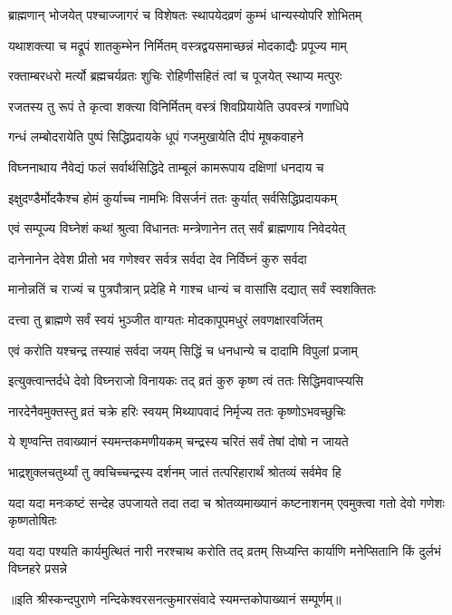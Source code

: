 \begin{center}
\twolineshloka
{ब्राह्मणान् भोजयेत् पश्चाज्जागरं च विशेषतः}
{स्थापयेदव्रणं कुम्भं धान्यस्योपरि शोभितम्}%

\twolineshloka
{यथाशक्त्या च मद्रूपं शातकुम्भेन निर्मितम्}
{वस्त्रद्वयसमाच्छन्नं मोदकाद्यैः प्रपूज्य माम्}%

\twolineshloka
{रक्ताम्बरधरो मर्त्यो ब्रह्मचर्यव्रतः शुचिः}
{रोहिणीसहितं त्वां च पूजयेत् स्थाप्य मत्पुरः}%

\twolineshloka
{रजतस्य तु रूपं ते कृत्वा शक्त्या विनिर्मितम्}
{वस्त्रं शिवप्रियायेति उपवस्त्रं गणाधिपे}%

\twolineshloka
{गन्धं लम्बोदरायेति पुष्पं सिद्धिप्रदायके}
{धूपं गजमुखायेति दीपं मूषकवाहने}%

\twolineshloka
{विघ्ननाथाय नैवेद्यं फलं सर्वार्थसिद्धिदे}
{ताम्बूलं कामरूपाय दक्षिणां धनदाय च}%

\twolineshloka
{इक्षुदण्डैर्मोदकैश्च होमं कुर्याच्च नामभिः}
{विसर्जनं ततः कुर्यात् सर्वसिद्धिप्रदायकम्}%

\twolineshloka
{एवं सम्पूज्य विघ्नेशं कथां श्रुत्वा विधानतः}
{मन्त्रेणानेन तत् सर्वं ब्राह्मणाय निवेदयेत्}%

\twolineshloka
{दानेनानेन देवेश प्रीतो भव गणेश्वर}
{सर्वत्र सर्वदा देव निर्विघ्नं कुरु सर्वदा}%

\twolineshloka
{मानोन्नतिं च राज्यं च पुत्रपौत्रान् प्रदेहि मे}
{गाश्च धान्यं च वासांसि दद्यात् सर्वं स्वशक्तितः}%

\twolineshloka
{दत्त्वा तु ब्राह्मणे सर्वं स्वयं भुञ्जीत वाग्यतः}
{मोदकापूपमधुरं लवणक्षारवर्जितम्}%

\twolineshloka
{एवं करोति यश्चन्द्र तस्याहं सर्वदा जयम्}
{सिद्धिं च धनधान्ये च दादामि विपुलां प्रजाम्}%

\twolineshloka
{इत्युक्त्वान्तर्दधे देवो विघ्नराजो विनायकः}
{तद् व्रतं कुरु कृष्ण त्वं ततः सिद्धिमवाप्स्यसि}%

\twolineshloka
{नारदेनैवमुक्तस्तु व्रतं चक्रे हरिः स्वयम्}
{मिथ्यापवादं निर्मृज्य ततः कृष्णोऽभवच्छुचिः}%

\twolineshloka
{ये शृण्वन्ति तवाख्यानं स्यमन्तकमणीयकम्}
{चन्द्रस्य चरितं सर्वं तेषां दोषो न जायते}%

\twolineshloka
{भाद्रशुक्लचतुर्थ्यां तु क्वचिच्चन्द्रस्य दर्शनम्}
{जातं तत्परिहारार्थं श्रोतव्यं सर्वमेव हि}%

\threelineshloka
{यदा यदा मनःकष्टं सन्देह उपजायते} 
{तदा तदा च श्रोतव्यमाख्यानं कष्टनाशनम्}
{एवमुक्त्वा गतो देवो गणेशः कृष्णतोषितः}%

\fourlineindentedshloka
{यदा यदा पश्यति कार्यमुत्थितं}
{नारी नरश्चाथ करोति तद् व्रतम्}
{सिध्यन्ति कार्याणि मनेप्सितानि}
{किं दुर्लभं विघ्नहरे प्रसन्ने}%

\end{center}

॥इति श्रीस्कन्दपुराणे नन्दिकेश्वरसनत्कुमारसंवादे स्यमन्तकोपाख्यानं सम्पूर्णम्॥

